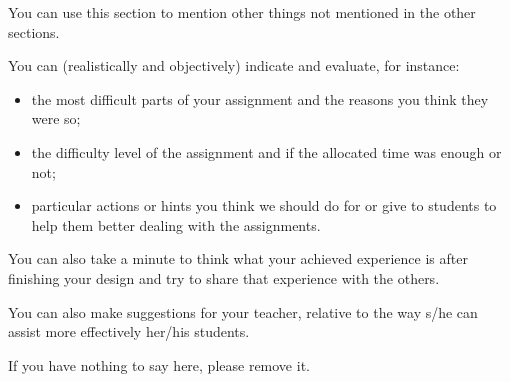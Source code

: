 You can use this section to mention other things not mentioned in the other sections. 

You can (realistically and objectively) indicate and evaluate, for instance:
\begin{itemize}
	\item the most difficult parts of your assignment and the reasons you think they were so; 
	
	\item the difficulty level of the assignment and if the allocated time was enough or not; 

	\item particular actions or hints you think we should do for or give to students to help them better dealing with the assignments.

\end{itemize}

You can also take a minute to think what your achieved experience is after finishing your design and try to share that experience with the others. 

You can also make suggestions for your teacher, relative to the way s/he can assist more effectively her/his students.

If you have nothing to say here, please remove it.